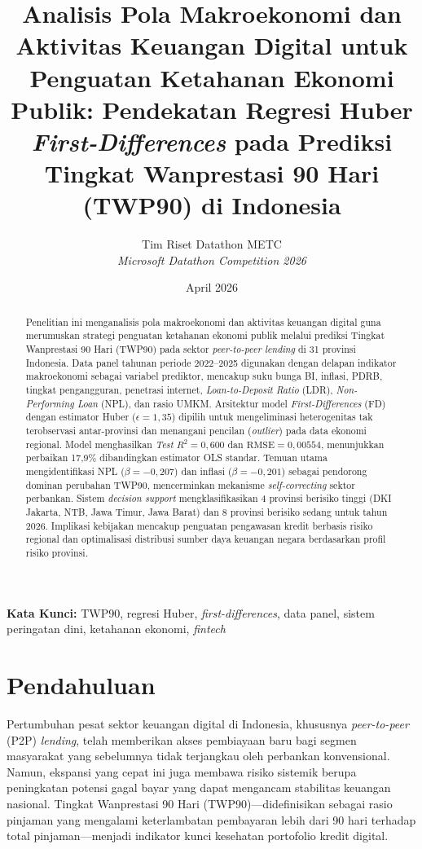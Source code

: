 \documentclass[12pt,a4paper]{article}
\title{\textbf{Analisis Pola Makroekonomi dan Aktivitas Keuangan Digital untuk Penguatan Ketahanan Ekonomi Publik: Pendekatan Regresi Huber \textit{First-Differences} pada Prediksi Tingkat Wanprestasi 90 Hari (TWP90) di Indonesia}}
\author{
Tim Riset Datathon METC\\
\textit{Microsoft Datathon Competition 2026}
}
\date{April 2026}
\begin{document}
\maketitle

\begin{abstract}
Penelitian ini menganalisis pola makroekonomi dan aktivitas keuangan digital guna merumuskan strategi penguatan ketahanan ekonomi publik melalui prediksi Tingkat Wanprestasi 90 Hari (TWP90) pada sektor \textit{peer-to-peer lending} di 31 provinsi Indonesia. Data panel tahunan periode 2022--2025 digunakan dengan delapan indikator makroekonomi sebagai variabel prediktor, mencakup suku bunga BI, inflasi, PDRB, tingkat pengangguran, penetrasi internet, \textit{Loan-to-Deposit Ratio} (LDR), \textit{Non-Performing Loan} (NPL), dan rasio UMKM. Arsitektur model \textit{First-Differences} (FD) dengan estimator Huber ($\epsilon = 1{,}35$) dipilih untuk mengeliminasi heterogenitas tak terobservasi antar-provinsi dan menangani pencilan (\textit{outlier}) pada data ekonomi regional. Model menghasilkan \textit{Test} $R^2 = 0{,}600$ dan $\text{RMSE} = 0{,}00554$, menunjukkan perbaikan 17{,}9\% dibandingkan estimator OLS standar. Temuan utama mengidentifikasi NPL ($\beta = -0{,}207$) dan inflasi ($\beta = -0{,}201$) sebagai pendorong dominan perubahan TWP90, mencerminkan mekanisme \textit{self-correcting} sektor perbankan. Sistem \textit{decision support} mengklasifikasikan 4 provinsi berisiko tinggi (DKI Jakarta, NTB, Jawa Timur, Jawa Barat) dan 8 provinsi berisiko sedang untuk tahun 2026. Implikasi kebijakan mencakup penguatan pengawasan kredit berbasis risiko regional dan optimalisasi distribusi sumber daya keuangan negara berdasarkan profil risiko provinsi.
\end{abstract}

\textbf{Kata Kunci:} TWP90, regresi Huber, \textit{first-differences}, data panel, sistem peringatan dini, ketahanan ekonomi, \textit{fintech}

\section{Pendahuluan}

Pertumbuhan pesat sektor keuangan digital di Indonesia, khususnya \textit{peer-to-peer} (P2P) \textit{lending}, telah memberikan akses pembiayaan baru bagi segmen masyarakat yang sebelumnya tidak terjangkau oleh perbankan konvensional. Namun, ekspansi yang cepat ini juga membawa risiko sistemik berupa peningkatan potensi gagal bayar yang dapat mengancam stabilitas keuangan nasional. Tingkat Wanprestasi 90 Hari (TWP90)---didefinisikan sebagai rasio pinjaman yang mengalami keterlambatan pembayaran lebih dari 90 hari terhadap total pinjaman---menjadi indikator kunci kesehatan portofolio kredit digital.
\end{document}
